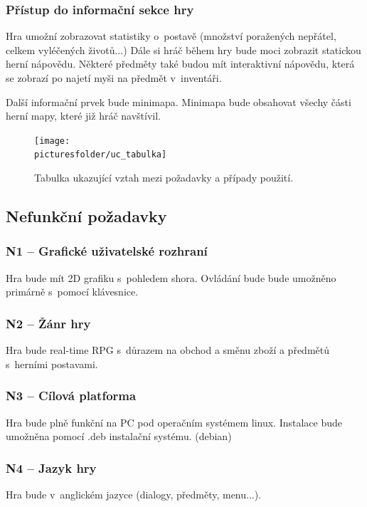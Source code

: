 \documentclass[12pt,a4paper]{article}
\def\picturesfolder{obrazky}
\begin{document}
\subsubsection{Přístup do informační sekce hry}
Hra umožní zobrazovat statistiky o~postavě (množství poražených nepřátel,
celkem vyléčených životů$\dots$) Dále si hráč během hry bude moci zobrazit statickou
herní nápovědu. Některé předměty také budou mít interaktivní nápovědu, která se
zobrazí po najetí myši na předmět v~inventáři.

Další informační prvek bude minimapa. Minimapa bude obsahovat všechy části herní
mapy, které již hráč navštívil.

\begin{figure}
\begin{center}
  \texttt{[image: \\picturesfolder/uc\_tabulka]}
  \caption{Tabulka ukazující vztah mezi požadavky a případy použití.}
  \label{uc:tabulka}
  \end{center}
\end{figure}

\subsection{Nefunkční požadavky}

\subsubsection{N1 --  Grafické uživatelské rozhraní  }
  Hra bude mít 2D grafiku s~pohledem shora. Ovládání bude bude umožněno
  primárně s~pomocí klávesnice.

\subsubsection{N2 -- Žánr hry}
  Hra bude real-time RPG s~důrazem na obchod a směnu zboží a předmětů s~herními
  postavami.

\subsubsection{N3 -- Cílová platforma}
Hra bude plně funkční na PC pod operačním systémem linux. Instalace bude
umožněna pomocí .deb instalační systému. (debian)

\subsubsection{N4 -- Jazyk hry}
Hra bude v~anglickém jazyce (dialogy, předměty, menu$\dots$).
\end{document}
